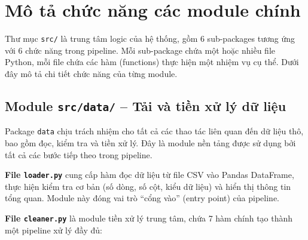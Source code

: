 \section{Mô tả chức năng các module chính}

Thư mục \texttt{src/} là trung tâm logic của hệ thống, gồm 6 sub-packages tương ứng với 6 chức năng trong pipeline. Mỗi sub-package chứa một hoặc nhiều file Python, mỗi file chứa các hàm (functions) thực hiện một nhiệm vụ cụ thể. Dưới đây mô tả chi tiết chức năng của từng module.

\subsection{Module \texttt{src/data/} -- Tải và tiền xử lý dữ liệu}

Package \texttt{data} chịu trách nhiệm cho tất cả các thao tác liên quan đến dữ liệu thô, bao gồm đọc, kiểm tra và tiền xử lý. Đây là module nền tảng được sử dụng bởi tất cả các bước tiếp theo trong pipeline.

\textbf{File \texttt{loader.py}} cung cấp hàm đọc dữ liệu từ file CSV vào Pandas DataFrame, thực hiện kiểm tra cơ bản (số dòng, số cột, kiểu dữ liệu) và hiển thị thông tin tổng quan. Module này đóng vai trò ``cổng vào'' (entry point) của pipeline.

\textbf{File \texttt{cleaner.py}} là module tiền xử lý trung tâm, chứa 7 hàm chính tạo thành một pipeline xử lý đầy đủ:

